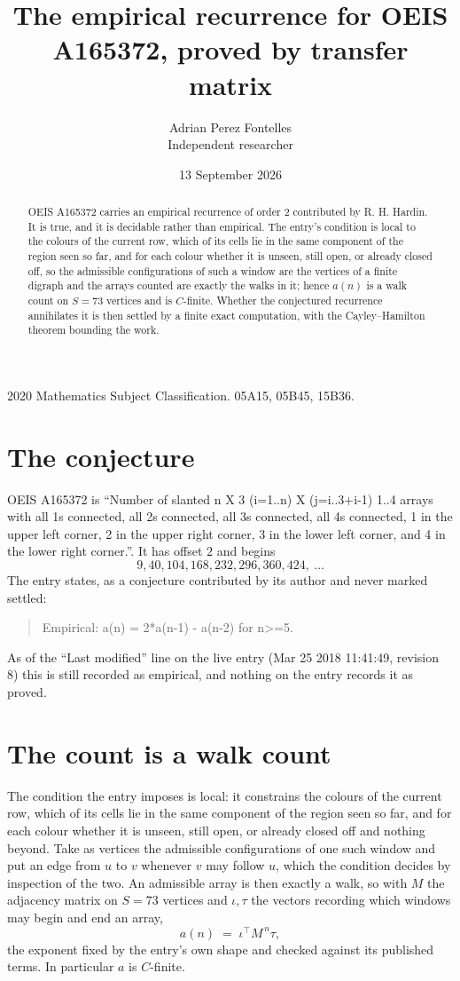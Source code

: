 \documentclass[11pt,a4paper]{article}
\title{The empirical recurrence for OEIS A165372, proved by transfer matrix}
\author{Adrian Perez Fontelles\\ \small Independent researcher}
\date{13 September 2026}
\theoremstyle{plain}
\theoremstyle{definition}
\begin{document}
\maketitle

\begin{abstract}
OEIS A165372 carries an empirical recurrence of order $2$ contributed by R. H. Hardin. It is
true, and it is decidable rather than empirical. The entry's condition is local to the colours of the current row, which of its cells lie in the same component of the region seen so far, and for each colour whether it is unseen, still open, or already closed off, so
the admissible configurations of such a window are the vertices of a finite digraph and the
arrays counted are exactly the walks in it; hence $a(n)$ is a walk count on $S=73$ vertices
and is $C$-finite. Whether the conjectured recurrence annihilates it is then settled by a
finite exact computation, with the Cayley--Hamilton theorem bounding the work.
\end{abstract}

\noindent\small 2020 Mathematics Subject Classification. 05A15, 05B45, 15B36.\normalsize

\section{The conjecture}

OEIS A165372 is ``Number of slanted n X 3 (i=1..n) X (j=i..3+i-1) 1..4 arrays with all 1s connected, all 2s connected, all 3s connected, all 4s connected, 1 in the upper left corner, 2 in the upper right corner, 3 in the lower left corner, and 4 in the lower right corner.''. It has offset $2$ and begins
\[
9, 40, 104, 168, 232, 296, 360, 424,\ \dots
\]
The entry states, as a conjecture contributed by its author and never marked settled:
\begin{quote}
Empirical: a(n) = 2*a(n-1) - a(n-2) for n>=5.
\end{quote}
As of the ``Last modified'' line on the live entry (Mar 25 2018 11:41:49, revision 8) this is still
recorded as empirical, and nothing on the entry records it as proved.

\section{The count is a walk count}

The condition the entry imposes is local: it constrains the colours of the current row, which of its cells lie in the same component of the region seen so far, and for each colour whether it is unseen, still open, or already closed off and nothing beyond. Take as
vertices the admissible configurations of one such window and put an edge from $u$ to $v$
whenever $v$ may follow $u$, which the condition decides by inspection of the two. An
admissible array is then exactly a walk, so with $M$ the adjacency matrix on $S=73$ vertices
and $\iota,\tau$ the vectors recording which windows may begin and end an array,
\[
a(n)\;=\;\iota^{\!\top}M^{\,n}\tau ,
\]
the exponent fixed by the entry's own shape and checked against its published terms. In
particular $a$ is $C$-finite.
\end{document}

